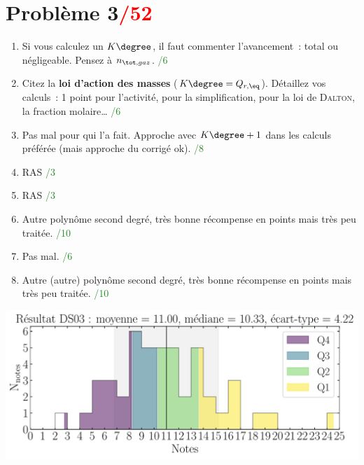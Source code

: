 \documentclass[a4paper, 10pt, final, garamond]{book}
\begin{document}
\section{Problème 3\hfill \textcolor{red}{/52}}

\begin{enumerate}
    \item Si vous calculez un $K\degree$, il faut commenter l'avancement~: total
        ou négligeable. Pensez à $n_{\tot, gaz}$.
        \hfill \textcolor{ForestGreen}{/6}
    \item Citez la \textbf{loi d'action des masses} ($K\degree = Q_{r, \eq}$).
        Détaillez vos calculs~: 1 point pour l'activité, pour la simplification,
        pour la loi de \textsc{Dalton}, la fraction molaire…
        \hfill \textcolor{ForestGreen}{/6}
    \item Pas mal pour qui l'a fait. Approche avec $K\degree+1$ dans les calculs
        préférée (mais approche du corrigé ok).
        \hfill \textcolor{ForestGreen}{/8}
    \item RAS
        \hfill \textcolor{ForestGreen}{/3}
    \item RAS
        \hfill \textcolor{ForestGreen}{/3}
    \item Autre polynôme second degré, très bonne récompense en points mais très
        peu traitée.
        \hfill \textcolor{ForestGreen}{/10}
    \item Pas mal.
        \hfill \textcolor{ForestGreen}{/6}
    \item Autre (autre) polynôme second degré, très bonne récompense en points
        mais très peu traitée.
        \hfill \textcolor{ForestGreen}{/10}
\end{enumerate}

\vfill

\begin{center}
    \includegraphics[width=.72\linewidth]{res_DS03.pdf}
\end{center}

\vfill
\end{document}
